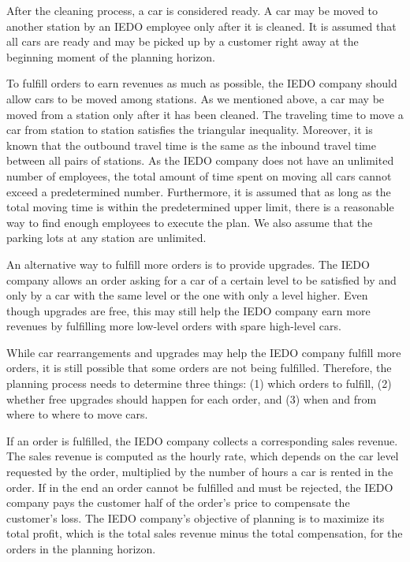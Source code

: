\documentclass[11pt,a4paper]{article}
\begin{document}
After the cleaning process, a car is considered ready. A car may be moved to another station by an IEDO employee only after it is cleaned. It is assumed that all cars are ready and may be picked up by a customer right away at the beginning moment of the planning horizon. 

To fulfill orders to earn revenues as much as possible, the IEDO company should allow cars to be moved among stations. As we mentioned above, a car may be moved from a station only after it has been cleaned. The traveling time to move a car from station to station satisfies the triangular inequality. Moreover, it is known that the outbound travel time is the same as the inbound travel time between all pairs of stations. As the IEDO company does not have an unlimited number of employees, the total amount of time spent on moving all cars cannot exceed a predetermined number. Furthermore, it is assumed that as long as the total moving time is within the predetermined upper limit, there is a reasonable way to find enough employees to execute the plan. We also assume that the parking lots at any station are unlimited. 

An alternative way to fulfill more orders is to provide upgrades. The IEDO company allows an order asking for a car of a certain level to be satisfied by and only by a car with the same level or the one with only a level higher. Even though upgrades are free, this may still help the IEDO company earn more revenues by fulfilling more low-level orders with spare high-level cars.

While car rearrangements and upgrades may help the IEDO company fulfill more orders, it is still possible that some orders are not being fulfilled. Therefore, the planning process needs to determine three things: (1) which orders to fulfill, (2) whether free upgrades should happen for each order, and (3) when and from where to where to move cars.

If an order is fulfilled, the IEDO company collects a corresponding sales revenue. The sales revenue is computed as the hourly rate, which depends on the car level requested by the order, multiplied by the number of hours a car is rented in the order. If in the end an order cannot be fulfilled and must be rejected, the IEDO company pays the customer half of the order's price to compensate the customer's loss. The IEDO company's objective of planning is to maximize its total profit, which is the total sales revenue minus the total compensation, for the orders in the planning horizon.
\end{document}
